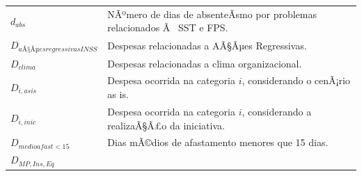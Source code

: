 \documentclass[]{article}
\begin{document}
\begin{longtable}[]{@{}ll@{}}
\begin{minipage}[t]{0.07\columnwidth}
\(d_{abs}\)\strut
\end{minipage} & \begin{minipage}[t]{0.87\columnwidth}\raggedright\strut
NÃºmero de dias de absenteÃ­smo por problemas relacionados Ã~ SST e
FPS.\strut
\end{minipage}\tabularnewline
\begin{minipage}[t]{0.07\columnwidth}\raggedright\strut
\(D_{aÃ§Ãµes regressivas INSS}\)\strut
\end{minipage} & \begin{minipage}[t]{0.87\columnwidth}\raggedright\strut
Despesas relacionadas a AÃ§Ãµes Regressivas.\strut
\end{minipage}\tabularnewline
\begin{minipage}[t]{0.07\columnwidth}\raggedright\strut
\(D_{clima}\)\strut
\end{minipage} & \begin{minipage}[t]{0.87\columnwidth}\raggedright\strut
Despesas relacionadas a clima organizacional.\strut
\end{minipage}\tabularnewline
\begin{minipage}[t]{0.07\columnwidth}\raggedright\strut
\(D_{i, asis}\)\strut
\end{minipage} & \begin{minipage}[t]{0.87\columnwidth}\raggedright\strut
Despesa ocorrida na categoria \(i\), considerando o cenÃ¡rio as
is.\strut
\end{minipage}\tabularnewline
\begin{minipage}[t]{0.07\columnwidth}\raggedright\strut
\(D_{i, inic}\)\strut
\end{minipage} & \begin{minipage}[t]{0.87\columnwidth}\raggedright\strut
Despesa ocorrida na categoria \(i\), considerando a realizaÃ§Ã£o da
iniciativa.\strut
\end{minipage}\tabularnewline
\begin{minipage}[t]{0.07\columnwidth}\raggedright\strut
\(D_{medioafast<15}\)\strut
\end{minipage} & \begin{minipage}[t]{0.87\columnwidth}\raggedright\strut
Dias mÃ©dios de afastamento menores que 15 dias.\strut
\end{minipage}\tabularnewline
\begin{minipage}[t]{0.07\columnwidth}\raggedright\strut
\(D_{MP,Ins,Eq}\)\strut
\end{minipage} & \begin{minipage}[t]{0.87\columnwidth}\raggedright\strut

\end{minipage}
\end{longtable}
\end{document}
